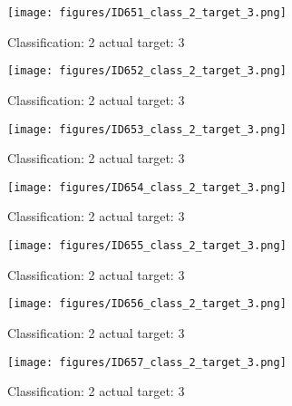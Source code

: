 \begin{figure}[h!]
\begin{center}
\texttt{[image: figures/ID651\_class\_2\_target\_3.png]}
\end{center}
\caption{ Classification: 2 actual target: 3}
\label{fig:ID651_class_2_target_3}
\end{figure}
\begin{figure}[h!]
\begin{center}
\texttt{[image: figures/ID652\_class\_2\_target\_3.png]}
\end{center}
\caption{ Classification: 2 actual target: 3}
\label{fig:ID652_class_2_target_3}
\end{figure}
\begin{figure}[h!]
\begin{center}
\texttt{[image: figures/ID653\_class\_2\_target\_3.png]}
\end{center}
\caption{ Classification: 2 actual target: 3}
\label{fig:ID653_class_2_target_3}
\end{figure}
\begin{figure}[h!]
\begin{center}
\texttt{[image: figures/ID654\_class\_2\_target\_3.png]}
\end{center}
\caption{ Classification: 2 actual target: 3}
\label{fig:ID654_class_2_target_3}
\end{figure}
\begin{figure}[h!]
\begin{center}
\texttt{[image: figures/ID655\_class\_2\_target\_3.png]}
\end{center}
\caption{ Classification: 2 actual target: 3}
\label{fig:ID655_class_2_target_3}
\end{figure}
\begin{figure}[h!]
\begin{center}
\texttt{[image: figures/ID656\_class\_2\_target\_3.png]}
\end{center}
\caption{ Classification: 2 actual target: 3}
\label{fig:ID656_class_2_target_3}
\end{figure}
\begin{figure}[h!]
\begin{center}
\texttt{[image: figures/ID657\_class\_2\_target\_3.png]}
\end{center}
\caption{ Classification: 2 actual target: 3}
\label{fig:ID657_class_2_target_3}
\end{figure}
